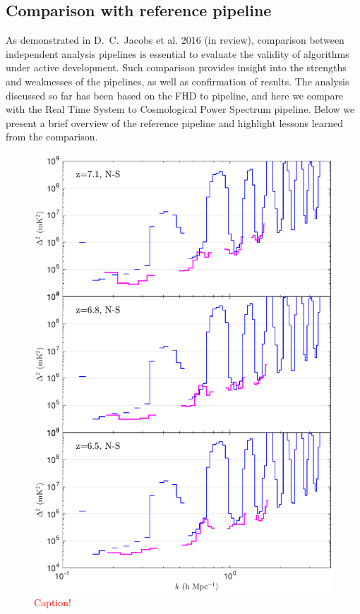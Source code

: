 \documentclass[iop]{emulateapj}
\begin{document}
\subsection{Comparison with reference pipeline}\label{subsec:ref_pipe}

As demonstrated in D.~C.~Jacobs et al. 2016 (in review), comparison between independent 
analysis pipelines is essential to evaluate the validity of algorithms under active development. 
Such comparison provides insight into the strengths and weaknesses of the pipelines, as well 
as confirmation of results. The analysis discussed so far has been based on the FHD to 
\eppsilon pipeline, and here we compare with the Real Time System \citep[RTS,][]
{Mitchell:2008,Ord:2010} to Cosmological  Power Spectrum \citep[CHIPS,][]
{Trott:2016} pipeline. Below we present a brief overview of the reference pipeline and 
highlight lessons learned from the comparison.


\begin{figure}
\includegraphics[width=\columnwidth]{1D_spectra_comparison.pdf}
\caption{
\textcolor{red}{Caption!}
\label{fig:ps_comparison}
}
\end{figure}
\end{document}
